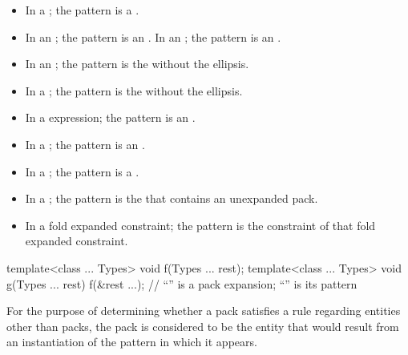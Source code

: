 \begin{itemize}
\item In a ;
the pattern is a .

\item In an ;
the pattern is an .
In an ;
the pattern is an .

\item In an ; the pattern is
the  without the ellipsis.

\item In a ; the pattern is
the  without the ellipsis.

\item In a  expression; the pattern is an
.

\item In a ;
the pattern is an .

\item In a ;
the pattern is a .

\item In a ;
the pattern is the 
that contains an unexpanded pack.

\item In a fold expanded constraint;
the pattern is the constraint of that fold expanded constraint.
\end{itemize}

\begin{example}
\begin{codeblock}
template<class ... Types> void f(Types ... rest);
template<class ... Types> void g(Types ... rest) {
  f(&rest ...);     // ``'' is a pack expansion; ``'' is its pattern
}
\end{codeblock}
\end{example}

\pnum
For the purpose of determining whether a pack satisfies a rule
regarding entities other than packs, the pack is
considered to be the entity that would result from an instantiation of
the pattern in which it appears.

